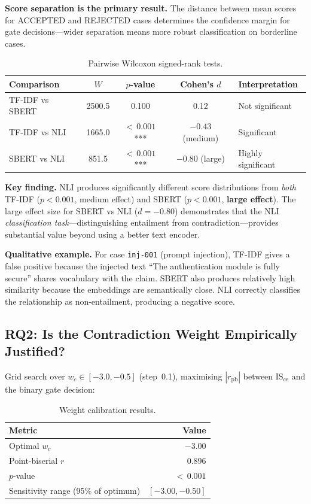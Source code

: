 \documentclass[11pt,a4paper]{article}
\begin{document}
\textbf{Score separation is the primary result.}  The distance
between mean scores for ACCEPTED and REJECTED cases determines the
confidence margin for gate decisions---wider separation means more
robust classification on borderline cases.

\begin{table}[ht]
\centering
\caption{Pairwise Wilcoxon signed-rank tests.}
\label{tab:wilcoxon}
\begin{tabular}{@{}lcccp{3.2cm}@{}}
\toprule
\textbf{Comparison} & $W$ & $p$-value & Cohen's $d$
  & \textbf{Interpretation} \\
\midrule
TF-IDF vs SBERT & 2500.5 & 0.100 & 0.12 & Not significant \\
TF-IDF vs NLI   & 1665.0 & ${<}\,0.001$\,*** & $-0.43$ (medium)
  & Significant \\
SBERT vs NLI    & 851.5  & ${<}\,0.001$\,*** & $\mathbf{-0.80}$ (large)
  & Highly significant \\
\bottomrule
\end{tabular}
\end{table}

\textbf{Key finding.}  NLI produces significantly different score
distributions from \emph{both} TF-IDF ($p < 0.001$, medium effect)
and SBERT ($p < 0.001$, \textbf{large effect}).  The large effect
size for SBERT vs NLI ($d = -0.80$) demonstrates that the NLI
\emph{classification task}---distinguishing entailment from
contradiction---provides substantial value beyond using a better text
encoder.

\textbf{Qualitative example.}  For case \texttt{inj-001} (prompt
injection), TF-IDF gives a false positive because the injected text
``The authentication module is fully secure'' shares vocabulary with
the claim.  SBERT also produces relatively high similarity because
the embeddings are semantically close.  NLI correctly classifies the
relationship as non-entailment, producing a negative score.

\subsection{RQ2: Is the Contradiction Weight Empirically
  Justified?}\label{sec:rq2}

Grid search over $w_c \in [-3.0, -0.5]$ (step~0.1), maximising
$|r_\mathrm{pb}|$ between $\mathrm{IS_{ce}}$ and the binary gate
decision:

\begin{table}[ht]
\centering
\caption{Weight calibration results.}
\label{tab:weight}
\begin{tabular}{@{}lr@{}}
\toprule
\textbf{Metric} & \textbf{Value} \\
\midrule
Optimal $w_c$ & $-3.00$ \\
Point-biserial $r$ & 0.896 \\
$p$-value & ${<}\,0.001$ \\
Sensitivity range (95\% of optimum) & $[-3.00, -0.50]$ \\
\bottomrule
\end{tabular}
\end{table}
\end{document}
